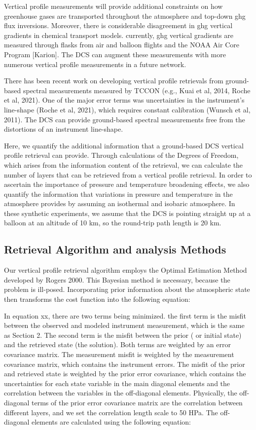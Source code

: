 \documentclass[amt, manuscript]{copernicus}
\begin{document}
Vertical profile measurements will provide additional constraints on how greenhouse gases are transported throughout the atmosphere and top-down ghg flux inversions. Moreover, there is considerable disagreement in ghg vertical gradients in chemical transport models. currently, ghg vertical gradients are measured through flasks from air and balloon flights and the NOAA Air Core Program [Karion]. The DCS can augment these measurements with more numerous vertical profile measurements in a future network. 

There has been recent work on developing vertical profile retrievals from ground-based spectral measurements measured by TCCON (e.g., Kuai et al, 2014, Roche et al, 2021). One of the major error terms was uncertainties in the instrument’s line-shape (Roche et al, 2021), which requires constant calibration (Wunsch  et al, 2011). The DCS can provide ground-based spectral measurements free from the distortions of an instrument line-shape. 

Here, we quantify the additional information that a ground-based DCS vertical profile retrieval can provide. Through calculations of the Degrees of Freedom, which arises from the information content of the retrieval, we can calculate the number of layers that can be retrieved from a vertical profile retrieval. In order to ascertain the importance of pressure and temperature broadening effects, we also quantify the information that variations in pressure and temperature in the atmosphere provides by assuming an isothermal and isobaric atmosphere. In these synthetic experiments, we assume that the DCS is pointing straight up at a balloon at an altitude of 10 km, so the round-trip path length is 20 km.

\subsection{Retrieval Algorithm and analysis Methods }
Our vertical profile retrieval algorithm employs the Optimal Estimation Method developed by Rogers 2000. This Bayesian method is necessary, because the problem is ill-posed. Incorporating prior information about the atmospheric state then transforms the cost function into the following equation:

In equation xx, there are two terms being minimized. the first term is the misfit between the observed and modeled instrument measurement, which is the same as Section 2. The second term is the misfit between the prior ( or initial state) and the retrieved state (the solution). Both terms are weighted by an error covariance matrix. The measurement misfit is weighted by the measurement covariance matrix, which contains the instrument errors. The misfit of the prior and retrieved state is weighted by the prior error covariance, which contains the uncertainties for each state variable in the main diagonal elements and the correlation between the variables in the off-diagonal elements. Physically, the off-diagonal terms of the prior error covariance matrix are the correlation between different layers, and we set the correlation length scale to 50 HPa. The off-diagonal elements are calculated using the following equation:
\end{document}
